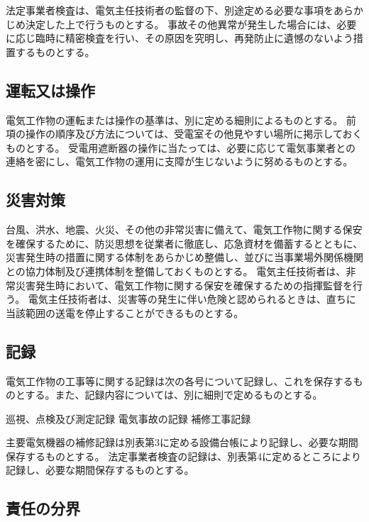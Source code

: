 \documentclass[10pt,a4paper,uplatex]{jsarticle}
\begin{document}
\term 法定事業者検査は、電気主任技術者の監督の下、別途定める必要な事項をあらかじめ決定した上で行うものとする。
\term 事故その他異常が発生した場合には、必要に応じ臨時に精密検査を行い、その原因を究明し、再発防止に遺憾のないよう措置するものとする。

\subsection{運転又は操作}
電気工作物の運転または操作の基準は、別に定める細則によるものとする。
\term 前項の操作の順序及び方法については、受電室その他見やすい場所に掲示しておくものとする。
\term 受電用遮断器の操作に当たっては、必要に応じて電気事業者との連絡を密にし、電気工作物の運用に支障が生じないように努めるものとする。

\subsection{災害対策}
台風、洪水、地震、火災、その他の非常災害に備えて、電気工作物に関する保安を確保するために、防災思想を従業者に徹底し、応急資材を備蓄するとともに、災害発生時の措置に関する体制をあらかじめ整備し、並びに当事業場外関係機関との協力体制及び連携体制を整備しておくものとする。
\term 電気主任技術者は、非常災害発生時において、電気工作物に関する保安を確保するための指揮監督を行う。
\term 電気主任技術者は、災害等の発生に伴い危険と認められるときは、直ちに当該範囲の送電を停止することができるものとする。

\subsection{記録}

電気工作物の工事等に関する記録は次の各号について記録し、これを保存するものとする。また、記録内容については、別に細則で定めるものとする。
\begin{enumerate}  
\itm 巡視、点検及び測定記録
\itm 電気事故の記録
\itm 補修工事記録
\end{enumerate}
\term 主要電気機器の補修記録は別表第3に定める設備台帳により記録し、必要な期間保存するものとする。
\term 法定事業者検査の記録は、別表第4に定めるところにより記録し、必要な期間保存するものとする。

\subsection{責任の分界}
\end{document}
